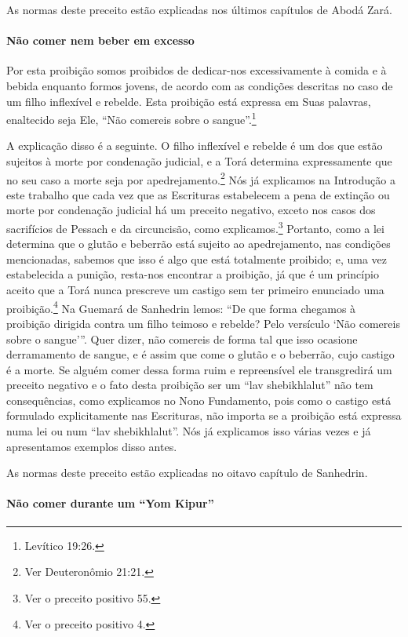 As normas deste preceito estão explicadas nos últimos capítulos de Abodá Zará.

\paragraph{Não comer nem beber em excesso}

Por esta proibição somos proibidos de dedicar-nos excessivamente à
comida e à bebida enquanto formos jovens, de acordo com as condições
descritas no caso de um filho inflexível e rebelde. Esta proibição está
expressa em Suas palavras, enaltecido seja Ele, ``Não comereis sobre o
sangue''.\footnote{Levítico 19:26.}

A explicação disso é a seguinte. O filho inflexível e rebelde é um dos
que estão sujeitos à morte por condenação judicial, e a Torá determina
expressamente que no seu caso a morte seja por
apedrejamento.\footnote{Ver Deuteronômio 21:21.} Nós já explicamos na Introdução a
este trabalho que cada vez que as Escrituras estabelecem a pena de
extinção ou morte por condenação judicial há um preceito negativo,
exceto nos casos dos sacrifícios de Pessach e da circuncisão, como
explicamos.\footnote{Ver o preceito positivo 55.} Portanto, como a lei determina que o
glutão e beberrão está sujeito ao apedrejamento, nas condições
mencionadas, sabemos que isso é algo que está totalmente proibido; e,
uma vez estabelecida a punição, resta-nos encontrar a proibição, já que
é um princípio aceito que a Torá nunca prescreve um castigo sem ter
primeiro enunciado uma proibição.\footnote{Ver o preceito positivo 4.} Na Guemará de
Sanhedrin lemos: ``De que forma chegamos à proibição dirigida contra um
filho teimoso e rebelde? Pelo versículo `Não comereis sobre o sangue'''.
Quer dizer, não comereis de forma tal que isso ocasione derramamento de
sangue, e é assim que come o glutão e o beberrão, cujo castigo é a
morte. Se alguém comer dessa forma ruim e repreensível ele transgredirá
um preceito negativo e o fato desta proibição ser um ``lav
shebikhlalut'' não tem consequências, como explicamos no Nono
Fundamento, pois como o castigo está formulado explicitamente nas
Escrituras, não importa se a proibição está expressa numa lei ou num
``lav shebikhlalut''. Nós já explicamos isso várias vezes e já
apresentamos exemplos disso antes.

As normas deste preceito estão explicadas no oitavo capítulo de Sanhedrin.

\paragraph{Não comer durante um ``Yom Kipur''}

